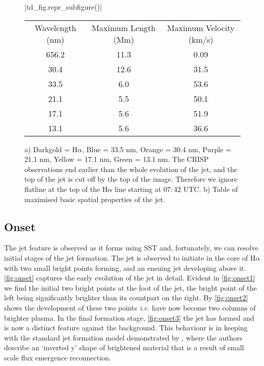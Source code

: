 \begin{figure}[H]
	\centering
	\py[chapter5]|td_fig.repr_subfigure()|
	
	\begin{subtable}[b]{\textwidth}
		\centering
		\begin{tabular}{ccc}
			Wavelength (nm) & Maximum Length (Mm) & Maximum Velocity (km/s) \\
			656.2 & 11.3 & 0.09 \\
			30.4 & 12.6 & 31.5 \\
			33.5 & 6.0 & 53.6 \\
			21.1 & 5.5 & 50.1 \\
			17.1 & 5.6 & 51.9 \\
			13.1 & 5.6 & 36.6 \\
		\end{tabular}
		\caption{}
	\end{subtable}
	\caption{a) Darkgold = H$\alpha$, Blue = 33.5 nm, Orange = 30.4 nm, Purple = 21.1 nm, Yellow = 17.1 nm, Green = 13.1 nm. The CRISP observations end earlier than the whole evolution of the jet, and the top of the jet is cut off by the top of the image. Therefore we ignore flatline at the top of the H$\alpha$ line starting at $07:42$ UTC. b) Table of maximised basic spatial properties of the jet.}
\end{figure}

\subsection{Onset}
The jet feature is observed as it forms using SST and, fortunately, we can resolve initial stages of the jet formation.
The jet is observed to initiate in the core of H$\alpha$ with two small bright points forming, and an ensuing jet developing above it. 
\cref{fig:onset} captures the early evolution of the jet in detail.
Evident in \cref{fig:onset1} we find the initial two bright points at the foot of the jet, the bright point of the left being significantly brighter than its countpart on the right.
By \cref{fig:onset2} shows the development of these two points \emph{i.e.} have now become two columns of brighter plasma.
In the final formation stage, \cref{fig:onset3} the jet has formed and is now a distinct feature against the background.
This behaviour is in keeping with the standard jet formation model demonstrated by \cite{Shibata1992}, where the authors describe an `inverted y' shape of brightened material that is a result of small scale flux emergence reconnection.





